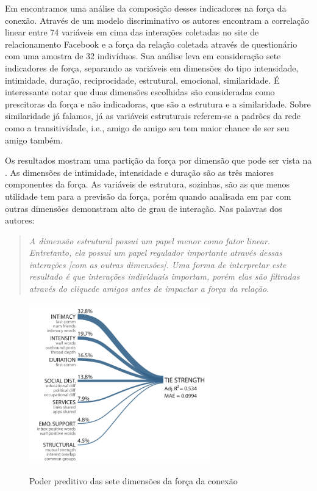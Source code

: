 Em \citet{Gilbert2009} encontramos uma análise da composição desses indicadores
na força da conexão. Através de um modelo discriminativo os autores encontram a
correlação linear entre 74 variáveis em cima das interações coletadas no site de
relacionamento Facebook e a força da relação coletada através de questionário com
uma amostra de 32 indivíduos. Sua análise leva em consideração sete indicadores
de força, separando as variáveis em dimensões do tipo intensidade, intimidade,
duração, reciprocidade, estrutural, emocional, similaridade. É interessante
notar que duas dimensões escolhidas são consideradas como prescitoras da força e
não indicadoras, que são a estrutura e a similaridade. Sobre similaridade já
falamos, já as variáveis estruturais referem-se a padrões da rede como a
transitividade, i.e., amigo de amigo seu tem maior chance de ser seu amigo
também.

Os resultados mostram uma partição da força por dimensão que pode ser vista na
. As dimensões de intimidade, intensidade e duração são
as três maiores componentes da força. As variáveis de estrutura, sozinhas, são as
que menos utilidade tem para a previsão da força, porém quando analisada em par
com outras dimensões demonstram alto de grau de interação. Nas palavras dos
autores:

	\begin{quote}{\citep{Gilbert2009}}
	\emph{A dimensão estrutural possui um papel menor como fator linear.
	Entretanto, ela possui um papel regulador importante através dessas interações
	[com as outras dimensões]. Uma forma de interpretar este resultado é que
	interações individuais importam, porém elas são filtradas através do
	clique\footnotemark de amigos antes de impactar a força da
	relação.}
	\end{quote}


\begin{figure}[h!]
  \caption{Poder preditivo das sete dimensões da força da conexão \citep{Gilbert2009}}
  \centering
    \includegraphics[width=0.7\textwidth]{imgs/composicao-forca.png}
    \label{fig:forca}
\end{figure}

